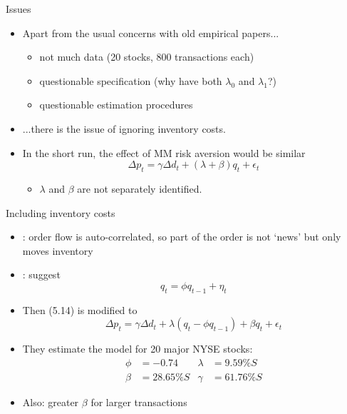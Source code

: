 \documentclass[english,10pt
,aspectratio=169
]{beamer}
\begin{document}
\begin{frame}{Issues}
	\begin{itemize}
		\item Apart from the usual concerns with old empirical papers...
		\begin{itemize}
			\item not much data (20 stocks, 800 transactions each)
			\item questionable specification (why have both $\lambda_0$ and $\lambda_1$?)
			\item questionable estimation procedures
		\end{itemize}
		\item ...there is the issue of ignoring inventory costs.
		\item In the short run, the effect of MM risk aversion would be similar
		\begin{equation} \tag{5.14}
		\Delta p_t = \gamma \Delta d_t + (\lambda + \beta) q_t + \epsilon_t
		\end{equation}
		\begin{itemize}
			\item $\lambda$ and $\beta$ are not separately identified.
		\end{itemize}
	\end{itemize}
\end{frame}


\begin{frame}[label=extending]{Including inventory costs}
	\begin{itemize}
		\item \textbf{\cite{hasbrouck_trades_1988}}: order flow is auto-correlated, so part of the order is not `news' but only moves inventory
		\item \textbf{\cite{huang_components_1997}}: suggest
		\begin{equation}\tag{5.17}
		q_t = \phi q_{t-1} + \eta_t
		\end{equation}
		\item Then (5.14) is modified to \hyperlink{derivation}{}
		\begin{equation} \tag{5.21}
		\Delta p_t = \gamma \Delta d_t + \lambda (q_t - \phi q_{t-1}) + \beta q_t + \epsilon_t
		\end{equation}
		\item They estimate the model for 20 major NYSE stocks: 
		\begin{align*}
			\phi &= -0.74	& \lambda &= 9.59\% S
			\\
			\beta &= 28.65\% S	& \gamma &= 61.76\% S
		\end{align*}
		\item Also: greater $\beta$ for larger transactions
	\end{itemize}
\end{frame}
\end{document}
